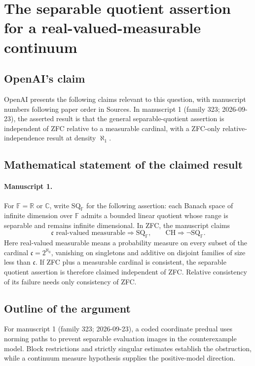 \documentclass[11pt]{article}
\begin{document}
\section*{The separable quotient assertion for a real-valued-measurable continuum}

\subsection{OpenAI's claim}
OpenAI presents the following claims relevant to this question, with manuscript numbers following paper order in Sources. In manuscript 1 (family 323; 2026-09-23), the asserted result is that the general separable-quotient assertion is independent of ZFC relative to a measurable cardinal, with a ZFC-only relative-independence result at density $\aleph_1$.

\subsection{Mathematical statement of the claimed result}
\paragraph{Manuscript 1.}
For $\mathbb F=\mathbb R$ or $\mathbb C$, write $\mathrm{SQ}_{\mathbb F}$ for the following assertion: each Banach space of infinite dimension over $\mathbb F$ admits a bounded linear quotient whose range is separable and remains infinite dimensional. In ZFC, the manuscript claims
\[
 \mathfrak c\text{ real-valued measurable}\Rightarrow\mathrm{SQ}_{\mathbb F},
 \qquad\mathrm{CH}\Rightarrow\neg\mathrm{SQ}_{\mathbb F}.
\]
Here real-valued measurable means a probability measure on every subset of the cardinal $\mathfrak c=2^{\aleph_0}$, vanishing on singletons and additive on disjoint families of size less than $\mathfrak c$. If ZFC plus a measurable cardinal is consistent, the separable quotient assertion is therefore claimed independent of ZFC. Relative consistency of its failure needs only consistency of ZFC.

\subsection{Outline of the argument}
For manuscript 1 (family 323; 2026-09-23), a coded coordinate predual uses norming paths to prevent separable evaluation images in the counterexample model. Block restrictions and strictly singular estimates establish the obstruction, while a continuum measure hypothesis supplies the positive-model direction.
\end{document}
